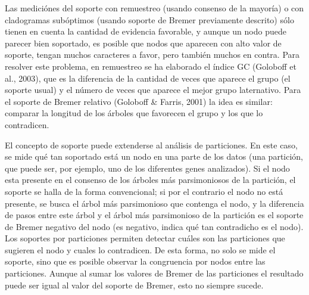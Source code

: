 Las medici\'ones del soporte con remuestreo (usando consenso de la mayor\'ia) o con cladogramas sub\'optimos (usando soporte de Bremer previamente descrito) s\'olo tienen en cuenta la cantidad de evidencia favorable, y aunque un nodo puede parecer bien soportado, es posible que nodos que aparecen con alto valor de soporte, tengan muchos caracteres a favor, pero tambi\'en muchos en contra. Para resolver este problema, en remuestreo se ha elaborado el \'indice GC (Goloboff et al., 2003), que es la diferencia de la cantidad de veces que aparece el grupo (el soporte usual) y el n\'umero de veces que aparece el mejor grupo laternativo. Para el soporte de Bremer relativo (Goloboff \& Farris, 2001) la idea es similar: comparar la longitud de los \'arboles que favorecen el grupo y los que lo contradicen.

El concepto de soporte puede extenderse al an\'alisis de particiones. En este caso, se mide qu\'e tan soportado est\'a un nodo en una parte de los datos (una partici\'on, que puede ser, por ejemplo, uno de los diferentes genes analizados). Si el nodo esta presente en el consenso de los \'arboles m\'as parsimoniosos de la partici\'on, el soporte se halla de la forma convencional; si por el contrario el nodo no est\'a presente, se busca el \'arbol m\'as parsimonioso que contenga el nodo, y la diferencia de pasos entre este \'arbol y el \'arbol m\'as parsimonioso de la partici\'on es el soporte de Bremer negativo del nodo (es negativo, indica qu\'e tan contradicho es el nodo). Los soportes por particiones permiten detectar cu\'ales son las particiones que sugieren el nodo y cuales lo contradicen. De esta forma, no solo se mide el soporte, sino que es posible observar la congruencia por nodos entre las particiones. Aunque al sumar los valores de Bremer de las particiones el resultado puede ser igual al valor del soporte de Bremer, esto no siempre sucede.



